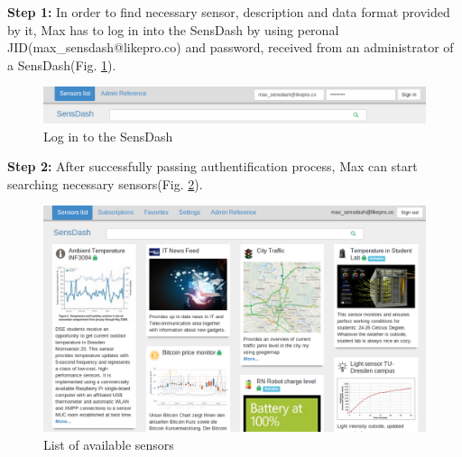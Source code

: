 \textbf{Step 1:} In order to find necessary sensor, description and data format provided by it, Max has to log in into the SensDash by using peronal JID(max\_sensdash@likepro.co) and password, received from an administrator of a SensDash(Fig. \ref{img:log_in}).
\begin{figure}[!ht]
\centering
\includegraphics[scale=0.6]{Screenshots/signIn.png}   
\caption[Log in to the SensDash]{Log in to the SensDash}
\label{img:log_in}                        
\end{figure}

\textbf{Step 2:} After successfully passing authentification process, Max can start searching necessary sensors(Fig. \ref{img:welcome_screen}).
\begin{figure}[!ht]
\centering
\includegraphics[scale=0.6]{Screenshots/Welcome.png}   
\caption[List of available sensors]{List of available sensors}
\label{img:welcome_screen}                       
\end{figure}

